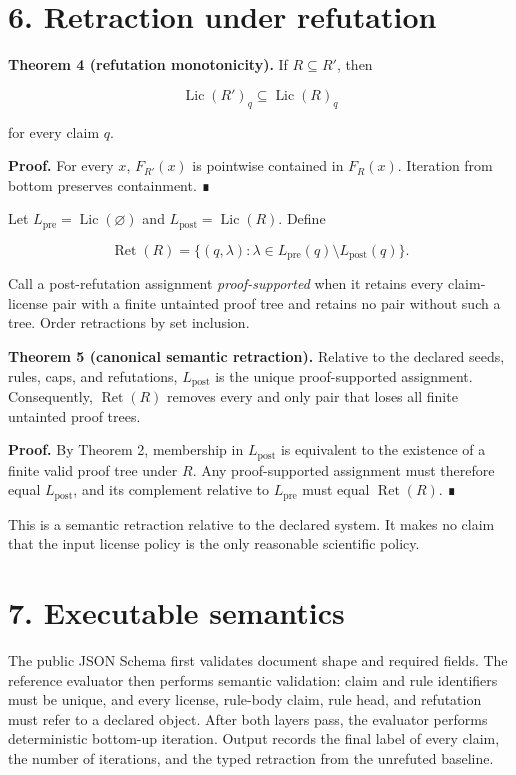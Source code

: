 \documentclass[
  11pt,
]{article}
\begin{document}
\hypertarget{retraction-under-refutation}{%
\section{6. Retraction under
refutation}\label{retraction-under-refutation}}

\textbf{Theorem 4 (refutation monotonicity).} If \(R\subseteq R'\), then

\[
\operatorname{Lic}(R')_q\subseteq\operatorname{Lic}(R)_q
\]

for every claim \(q\).

\textbf{Proof.} For every \(x\), \(F_{R'}(x)\) is pointwise contained in
\(F_R(x)\). Iteration from bottom preserves containment. ∎

Let \(L_{\mathrm{pre}}=\operatorname{Lic}(\varnothing)\) and
\(L_{\mathrm{post}}=\operatorname{Lic}(R)\). Define

\[
\operatorname{Ret}(R)
=\{(q, \lambda):
\lambda\in L_{\mathrm{pre}}(q)\setminus L_{\mathrm{post}}(q)\}.
\]

Call a post-refutation assignment \emph{proof-supported} when it retains
every claim-license pair with a finite untainted proof tree and retains
no pair without such a tree. Order retractions by set inclusion.

\textbf{Theorem 5 (canonical semantic retraction).} Relative to the
declared seeds, rules, caps, and refutations, \(L_{\mathrm{post}}\) is
the unique proof-supported assignment. Consequently,
\(\operatorname{Ret}(R)\) removes every and only pair that loses all
finite untainted proof trees.

\textbf{Proof.} By Theorem 2, membership in \(L_{\mathrm{post}}\) is
equivalent to the existence of a finite valid proof tree under \(R\).
Any proof-supported assignment must therefore equal
\(L_{\mathrm{post}}\), and its complement relative to
\(L_{\mathrm{pre}}\) must equal \(\operatorname{Ret}(R)\). ∎

This is a semantic retraction relative to the declared system. It makes
no claim that the input license policy is the only reasonable scientific
policy.

\hypertarget{executable-semantics}{%
\section{7. Executable semantics}\label{executable-semantics}}

The public JSON Schema first validates document shape and required
fields. The reference evaluator then performs semantic validation: claim
and rule identifiers must be unique, and every license, rule-body claim,
rule head, and refutation must refer to a declared object. After both
layers pass, the evaluator performs deterministic bottom-up iteration.
Output records the final label of every claim, the number of iterations,
and the typed retraction from the unrefuted baseline.
\end{document}
